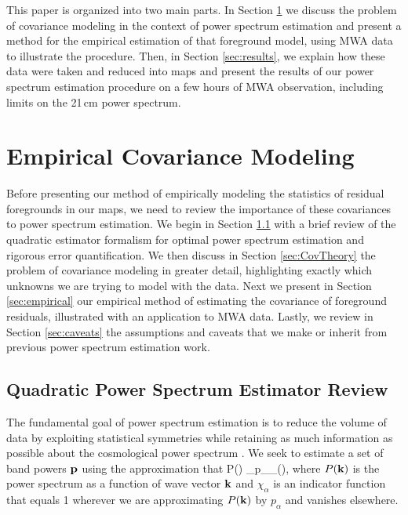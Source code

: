 This paper is organized into two main parts. In Section \ref{sec:methods} we discuss the problem of covariance modeling in the context of power spectrum estimation and present a method for the empirical estimation of that foreground model, using MWA data to illustrate the procedure. Then, in Section \ref{sec:results}, we explain how these data were taken and reduced into maps and present the results of our power spectrum estimation procedure on a few hours of MWA observation, including limits on the 21\,cm power spectrum.


\section{Empirical Covariance Modeling} \label{sec:methods}

Before presenting our method of empirically modeling the statistics of residual foregrounds in our maps, we need to review the importance of these covariances to power spectrum estimation. We begin in Section \ref{sec:review} with a brief review of the quadratic estimator formalism for optimal power spectrum estimation and rigorous error quantification. We then discuss in Section \ref{sec:CovTheory} the problem of covariance modeling in greater detail, highlighting exactly which unknowns we are trying to model with the data. Next we present in Section \ref{sec:empirical} our empirical method of estimating the covariance of foreground residuals, illustrated with an application to MWA data. Lastly, we review in Section \ref{sec:caveats} the assumptions and caveats that we make or inherit from previous power spectrum estimation work.


\subsection{Quadratic Power Spectrum Estimator Review}\label{sec:review}

The fundamental goal of power spectrum estimation is to reduce the volume of data by exploiting statistical symmetries while retaining as much information as possible about the cosmological power spectrum \cite{Maxpowerspeclossless}. We seek to estimate a set of band powers $\mathbf{p}$ using the approximation that
\beq
P(\kvec) \approx \sum_\alpha p_\alpha \chi_\alpha (\kvec),
\eeq
where $P(\mathbf{k})$ is the power spectrum as a function of wave vector $\mathbf{k}$ and $\chi_\alpha$ is an indicator function that equals 1 wherever we are approximating $P(\mathbf{k})$ by $p_\alpha$ and vanishes elsewhere.

